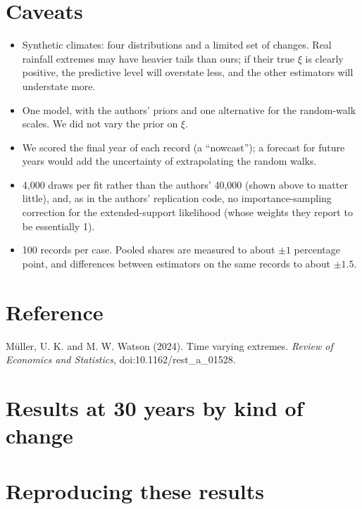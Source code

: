 \documentclass[11pt]{article}
\begin{document}
\section{Caveats}\label{sec:caveats}

\begin{itemize}
\item Synthetic climates: four distributions and a limited set of changes. Real rainfall extremes
  may have heavier tails than ours; if their true $\xi$ is clearly positive, the predictive level
  will overstate less, and the other estimators will understate more.
\item One model, with the authors' priors and one alternative for the random-walk scales. We did not
  vary the prior on $\xi$.
\item We scored the final year of each record (a ``nowcast''); a forecast for future years would add
  the uncertainty of extrapolating the random walks.
\item 4,000 draws per fit rather than the authors' 40,000 (shown above to matter little), and, as in
  the authors' replication code, no importance-sampling correction for the extended-support
  likelihood (whose weights they report to be essentially 1).
\item 100 records per case. Pooled shares are measured to about $\pm1$ percentage point, and
  differences between estimators on the same records to about $\pm1.5$.
\end{itemize}

\section*{Reference}

M\"uller, U. K. and M. W. Watson (2024). Time varying extremes. \emph{Review of Economics and
Statistics}, doi:10.1162/rest\_a\_01528.

\appendix
\section{Results at 30 years by kind of change}

\begin{table}[H]
\centering\small\setlength{\tabcolsep}{3.5pt}
\caption{As Table~\ref{tab:groups}, at 30 years.}

\end{table}

\section{Reproducing these results}
\end{document}
